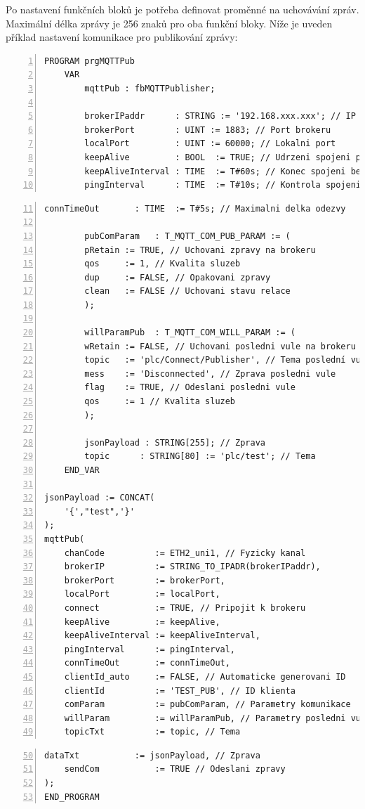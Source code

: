 Po nastavení funkčních bloků je potřeba definovat proměnné na uchovávání zpráv. Maximální délka zprávy je 256 znaků pro oba funkční bloky. Níže je uveden příklad nastavení komunikace pro publikování zprávy:
\begin{lstlisting}[language=ST, breaklines=true, numbers=left, numberstyle=\small, numbersep=10pt, frame=single, basicstyle=\ttfamily\small, caption={Příklad nastavení komunikace pro publikování zprávy}, label={lst:publikace}]
PROGRAM prgMQTTPub
    VAR
        mqttPub : fbMQTTPublisher;

        brokerIPaddr      : STRING := '192.168.xxx.xxx'; // IP adresa brokeru
        brokerPort        : UINT := 1883; // Port brokeru
        localPort         : UINT := 60000; // Lokalni port
        keepAlive         : BOOL  := TRUE; // Udrzeni spojeni po vypadku
        keepAliveInterval : TIME  := T#60s; // Konec spojeni bez dat
        pingInterval      : TIME  := T#10s; // Kontrola spojeni
\end{lstlisting}
\begin{lstlisting}[language=ST, breaklines=true, firstnumber=11, numbers=left, numberstyle=\small, numbersep=10pt, frame=single, basicstyle=\ttfamily\small]
        connTimeOut       : TIME  := T#5s; // Maximalni delka odezvy

        pubComParam   : T_MQTT_COM_PUB_PARAM := (
        pRetain := TRUE, // Uchovani zpravy na brokeru
        qos     := 1, // Kvalita sluzeb
        dup     := FALSE, // Opakovani zpravy
        clean   := FALSE // Uchovani stavu relace
        );

        willParamPub  : T_MQTT_COM_WILL_PARAM := (
        wRetain := FALSE, // Uchovani posledni vule na brokeru
        topic   := 'plc/Connect/Publisher', // Tema poslední vule
        mess    := 'Disconnected', // Zprava posledni vule
        flag    := TRUE, // Odeslani posledni vule
        qos     := 1 // Kvalita sluzeb
        );

        jsonPayload : STRING[255]; // Zprava
        topic      : STRING[80] := 'plc/test'; // Tema
    END_VAR

jsonPayload := CONCAT(
    '{',"test",'}'
);
mqttPub(
    chanCode          := ETH2_uni1, // Fyzicky kanal
    brokerIP          := STRING_TO_IPADR(brokerIPaddr),
    brokerPort        := brokerPort,
    localPort         := localPort,
    connect           := TRUE, // Pripojit k brokeru
    keepAlive         := keepAlive,
    keepAliveInterval := keepAliveInterval,
    pingInterval      := pingInterval,
    connTimeOut       := connTimeOut,
    clientId_auto     := FALSE, // Automaticke generovani ID
    clientId          := 'TEST_PUB', // ID klienta
    comParam          := pubComParam, // Parametry komunikace
    willParam         := willParamPub, // Parametry posledni vule
    topicTxt          := topic, // Tema
\end{lstlisting}
\pagebreak
\begin{lstlisting}[language=ST, breaklines=true, firstnumber=50, numbers=left, numberstyle=\small, numbersep=10pt, frame=single, basicstyle=\ttfamily\small]
    dataTxt           := jsonPayload, // Zprava
    sendCom           := TRUE // Odeslani zpravy
);
END_PROGRAM
\end{lstlisting}

